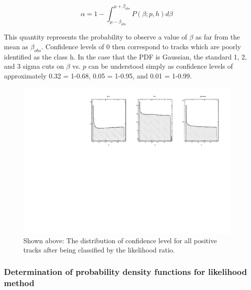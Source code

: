 \begin{equation}
  \alpha = 1 - \int_{\mu-\beta_{obs}}^{\mu+\beta_{obs}} P(\beta;p,h) d\beta
\end{equation}

This quantity represents the probability to observe a value of $\beta$ as far from the mean as $\beta_{obs}$.  Confidence levels of 0 then correspond to tracks which are poorly identified as the class h.  In the case that the PDF is Gaussian, the standard 1, 2, and 3 sigma cuts on $\beta$ vs. $p$ can be understood simply as confidence levels of approximately 0.32 = 1-0.68, 0.05 = 1-0.95, and 0.01 = 1-0.99.

\begin{figure}
  \begin{center}
    \includegraphics[width=14cm]{image/plots/hadron-id/confidence_level.pdf}
    \caption{ Shown above: The distribution of confidence level for all positive tracks after being classified by the likelihood ratio.}
  \end{center}
\end{figure}

\subsubsection*{Determination of probability density functions for likelihood method}

